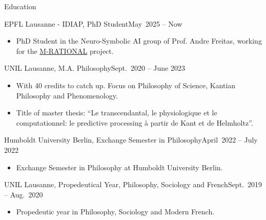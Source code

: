 \documentclass[]{mcdowellcv}
\begin{document}
    \makeheader
    



\begin{cvsection}{Education}
\begin{cvsubsection}{EPFL Lausanne - IDIAP, PhD Student}{}{May\ 2025 -- Now}
            \begin{itemize}
                \item PhD Student in the Neuro-Symbolic AI group of Prof. Andre Freitas, working for the \href{https://data.snf.ch/grants/grant/10004303}{M-RATIONAL} project.
            \end{itemize}
\end{cvsubsection}
\begin{cvsubsection}{UNIL Lausanne, M.A. Philosophy}{}{Sept.\ 2020 -- June 2023}
            \begin{itemize}
                \item With 40 credits to catch up. Focus on Philosophy of Science, Kantian Philosophy and Phenomenology.  
                \item Title of master thesis: ``Le transcendantal, le physiologique et le computationnel: le predictive processing à partir de Kant et de Helmholtz''.
            \end{itemize}
\end{cvsubsection}
\begin{cvsubsection}{Humboldt University Berlin, Exchange Semester in Philosophy}{}{April\ 2022 -- July 2022}
            \begin{itemize}
                \item Exchange Semester in Philosophy at Humboldt University Berlin.
            \end{itemize}
\end{cvsubsection}
        \begin{cvsubsection}{UNIL Lausanne, Propedeutical Year, Philosophy, Sociology and French}{}{Sept.\ 2019 -- Aug.\ 2020}
            \begin{itemize}
                \item Propedeutic year in Philosophy, Sociology and Modern French. 

\end{itemize}
\end{cvsubsection}
\end{cvsection}
\end{document}
